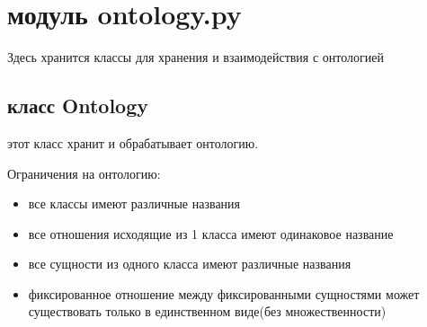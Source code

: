 \documentclass{article}
\begin{document}
	\large
	\section{модуль ontology.py}
	Здесь хранится классы для хранения и взаимодействия с онтологией
	
	\subsection{класс Ontology}
	этот класс хранит и обрабатывает онтологию.
	
	Ограничения на онтологию:
	\begin{itemize}
		\item все классы имеют различные названия
		\item все отношения исходящие из 1 класса имеют одинаковое название
		\item все сущности из одного класса имеют различные названия
		\item фиксированное отношение между фиксированными сущностями может существовать только в единственном виде(без множественности)
	\end{itemize}\ \\
	
\end{document}
